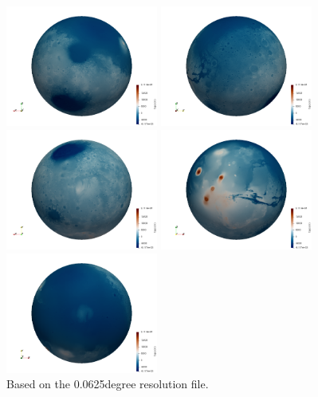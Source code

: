 \begin{center}
\includegraphics[width=5cm]{python_codes/fieldstone_100/images/topo3D_4}
\includegraphics[width=5cm]{python_codes/fieldstone_100/images/topo3D_2}\\
\includegraphics[width=5cm]{python_codes/fieldstone_100/images/topo3D_5}
\includegraphics[width=5cm]{python_codes/fieldstone_100/images/topo3D_3}
\includegraphics[width=5cm]{python_codes/fieldstone_100/images/topo3D_6}\\
{\captionfont Based on the 0.0625degree resolution file.}
\end{center}

